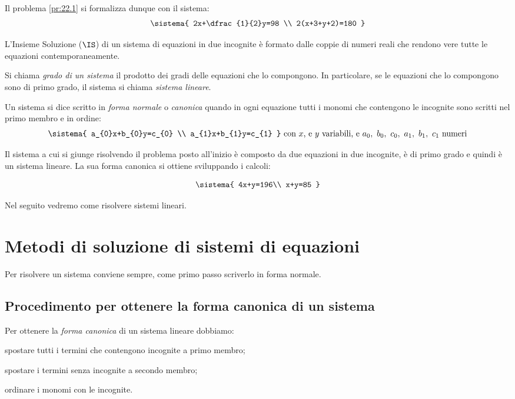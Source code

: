 Il problema \ref{pr:22.1} si formalizza dunque con il sistema:
\[\sistema{
 2x+\dfrac{1}{2}y=98 \\
 2(x+3+y+2)=180
}\]

\begin{definizione}
L'Insieme Soluzione (\(\IS\)) di un sistema di equazioni in
due incognite è formato dalle coppie di numeri reali
che rendono vere tutte le equazioni contemporaneamente.
\end{definizione}

\begin{definizione}
Si chiama \emph{grado di un sistema} il prodotto dei gradi delle
equazioni che lo compongono. In particolare, se le equazioni che lo
compongono sono di primo grado, il sistema si chiama \emph{sistema lineare}.
\end{definizione}

\begin{definizione}
Un sistema si dice scritto in \emph{forma normale} o \emph{canonica} 
quando in ogni equazione tutti i monomi che contengono le incognite sono 
scritti nel primo membro e in ordine:
\[\sistema{
 a_{0}x+b_{0}y=c_{0} \\
 a_{1}x+b_{1}y=c_{1} 
}
\text{ con }x \text{, e } y \text{ variabili} \text{, e } 
a_{0},~b_{0},~c_{0},~a_{1},~b_{1},~c_{1}\text{ numeri}\]
\end{definizione}

Il sistema a cui si giunge risolvendo il problema posto all'inizio è
composto da due equazioni in due incognite, è di primo grado 
e quindi è un sistema lineare. 
La sua forma canonica si ottiene sviluppando i calcoli:

\[\sistema{
4x+y=196\\
x+y=85
}\]

Nel seguito vedremo come risolvere sistemi lineari.

\section{Metodi di soluzione di sistemi di equazioni}
\label{sec:sist_soluzione}

Per risolvere un sistema conviene sempre, come primo passo scriverlo in forma 
normale.

\subsection{Procedimento per ottenere la forma canonica di un sistema}
Per ottenere la \emph{forma canonica} di un sistema lineare dobbiamo:
\begin{enumerate*}
 \item spostare tutti i termini che contengono incognite a primo membro;
 \item spostare i termini senza incognite a secondo membro;
 \item ordinare i monomi con le incognite.
\end{enumerate*}

